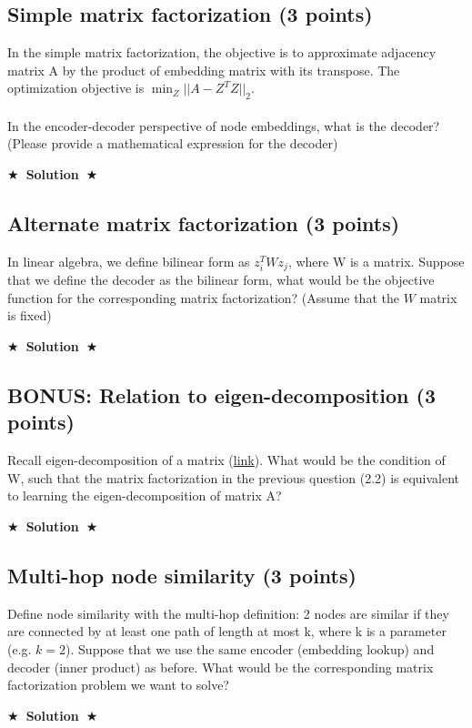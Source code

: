 \documentclass{article}
\numberwithin{figure}{section}
\newcommand{\Solution}[1]{{\medskip \color{red} \bf $\bigstar$~\sf \textbf{Solution}~$\bigstar$ \sf #1 } \bigskip}
\begin{document}
\subsection{Simple matrix factorization (3 points)}
In the simple matrix factorization, the objective is to approximate adjacency matrix A by the product of embedding matrix with its transpose. The optimization objective is $\min_Z ||A - Z^TZ||_2$.\\
\\
In the encoder-decoder perspective of node embeddings, what is the decoder? (Please provide a mathematical expression for the decoder)

\Solution{}



\subsection{Alternate matrix factorization (3 points)}
In linear algebra, we define bilinear form as $z_i^T W z_j$, where W is a matrix. Suppose that we define the decoder as the bilinear form, what would be the objective function for the corresponding matrix factorization? (Assume that the $W$ matrix is fixed)

\Solution{}



\subsection{BONUS: Relation to eigen-decomposition (3 points)}
Recall eigen-decomposition of a matrix (\href{https://en.wikipedia.org/wiki/Eigendecomposition_of_a_matrix}{link}). What would be the condition of W, such that the matrix factorization in the previous question (2.2) is equivalent to learning the eigen-decomposition of matrix A?

\Solution{}

\subsection{Multi-hop node similarity (3 points)}
Define node similarity with the multi-hop definition: 2 nodes are similar if they are connected by at least one path of length at most k, where k is a parameter (e.g. $k = 2$). Suppose that we use the same encoder (embedding lookup) and decoder (inner product) as before. What would be the corresponding matrix factorization problem we want to solve?

\Solution{}
\end{document}
